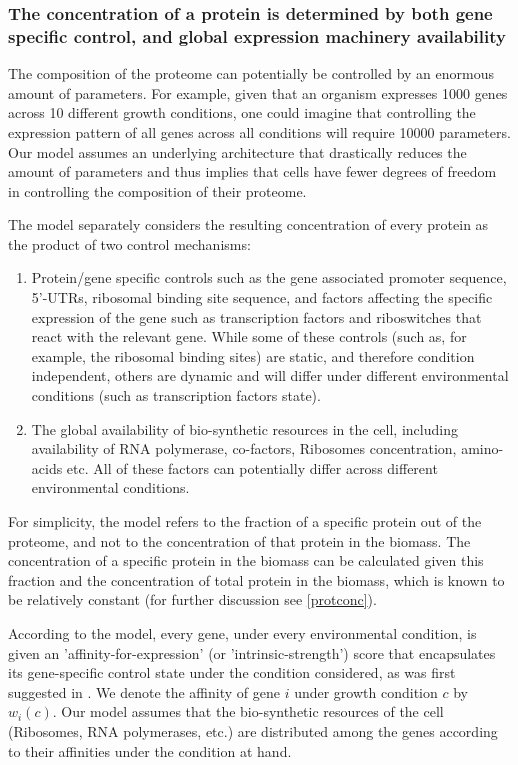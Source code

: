 \subsubsection{The concentration of a protein is determined by both gene specific control, and global
expression machinery availability}
The composition of the proteome can potentially be controlled by an enormous amount of parameters.
For example, given that an organism expresses 1000 genes across 10 different growth conditions, one could imagine that controlling the expression pattern of all genes across all conditions will require 10000 parameters.
Our model assumes an underlying architecture that drastically reduces the amount of parameters and thus implies that cells have fewer degrees of freedom in controlling the composition of their proteome.

The model separately considers the resulting concentration of every protein as the product of two control mechanisms:
\begin{enumerate}
\item Protein/gene specific controls such as the gene associated promoter sequence, 5'-UTRs, ribosomal binding site sequence, and factors affecting the specific expression of the gene such as transcription factors and riboswitches that react with the relevant gene.
  While some of these controls (such as, for example, the ribosomal binding sites) are static, and therefore condition independent, others are dynamic and will differ under different environmental conditions (such as transcription factors state).
\item The global availability of bio-synthetic resources in the cell, including availability of RNA polymerase, co-factors, Ribosomes concentration, amino-acids etc.
  All of these factors can potentially differ across different environmental conditions.
\end{enumerate}

For simplicity, the model refers to the fraction of a specific protein out of the proteome, and not to the concentration of that protein in the biomass.
The concentration of a specific protein in the biomass can be calculated given this fraction and the concentration of total protein in the biomass, which is known to be relatively constant \cite{Bremer1987,Scott2014} (for further discussion see \ref{protconc}).

According to the model, every gene, under every environmental condition, is given an 'affinity-for-expression' (or 'intrinsic-strength') score that encapsulates its gene-specific control state under the condition considered, as was first suggested in \cite{Maaloe1969}.
We denote the affinity of gene $i$ under growth condition $c$ by $w_i(c)$.
Our model assumes that the bio-synthetic resources of the cell (Ribosomes, RNA polymerases, etc.) are distributed among the genes according to their affinities under the condition at hand.